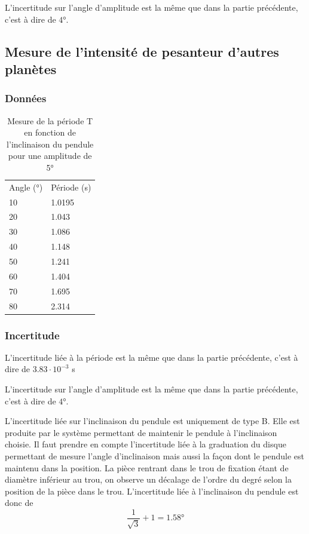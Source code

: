 \documentclass[a4paper,10pt,french]{scrartcl}
\begin{document}
L'incertitude sur l'angle d'amplitude est la m\^eme que dans la partie précédente, c'est à dire de \(4\)°.
\subsection{Mesure de l'intensité de pesanteur d'autres planètes}
\subsubsection{Données}
\begin{table}[H]
\begin{center}
\begin{tabular}{ll}
Angle (°) & Période (s)\\
10 & 1.0195\\
20 & 1.043\\
30 & 1.086\\
40&1.148\\
50&1.241\\
60&1.404\\
70&1.695\\
80&2.314
\end{tabular}
\end{center}
\caption{Mesure de la période T en fonction de l'inclinaison du pendule pour une amplitude de 5°}
\label{tab:inclinaison}
\end{table}
\subsubsection{Incertitude}
L'incertitude liée à la période est la m\^eme que dans la partie précédente, c'est à dire de \(3.83\cdot 10^{-3}\) s

L'incertitude sur l'angle d'amplitude est la m\^eme que dans la partie précédente, c'est à dire de \(4\)°.

L'incertitude liée sur l'inclinaison du pendule est uniquement de type B. Elle est produite par le système permettant de maintenir le pendule à l'inclinaison choisie. Il faut prendre en compte l'incertitude liée à la graduation du disque permettant de mesure l'angle d'inclinaison mais aussi la façon dont le pendule est maintenu dans la position. La pièce rentrant dans le trou de fixation étant de diamètre inférieur au trou, on observe un décalage de l'ordre du degré selon la position de la pièce dans le trou. L'incertitude liée à l'inclinaison du pendule est donc de \[\frac{1}{\sqrt{3}}+ 1 = 1.58 \texttt{°}\]
\end{document}
